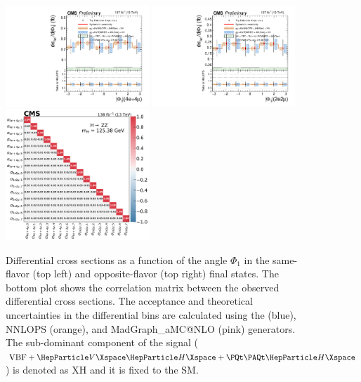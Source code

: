 \clearpage

\begin{center}
	\begin{figure}[!htb]
		\centering
		\includegraphics[width=0.48\textwidth]{Images/H4L/angles/model_v4/phistar_unfoldwith_4l_SM_125_asimov.pdf}
		\includegraphics[width=0.48\textwidth]{Images/H4L/angles/model_v4/phistar_unfoldwith_2e2mu_SM_125_asimov.pdf}\\
		\includegraphics[width=0.48\textwidth]{Images/H4L/correlations/corr_phistar_v4.pdf} \\
		\caption{
			Differential cross sections as a function of the angle $\Phi_\text{1}$ in the same-flavor (top left) and opposite-flavor (top right)  final states.
			The bottom plot shows the correlation matrix between the observed differential cross sections.
			The acceptance and theoretical uncertainties in the differential bins are calculated using the \POWHEG (blue), NNLOPS (orange), and MadGraph\_aMC@NLO (pink) generators.
			The sub-dominant component of the signal ($\VBF + \VH + \ttH$) is denoted as XH and it is fixed to the SM.
			\label{fig:fidPHISTAR}}
	\end{figure}
\end{center}

